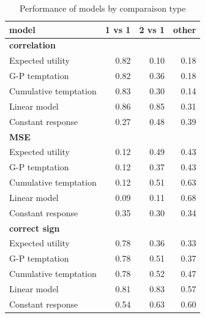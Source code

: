 \documentclass[
]{book}
\begin{document}
\begin{table}

\caption{\label{tab:comp-models-table3}Performance of models by comparaison type}
\centering
\begin{tabular}[t]{l|r|r|r}
\hline
model & 1 vs 1 & 2 vs 1 & other\\
\hline
\multicolumn{4}{l}{\textbf{correlation}}\\
\hline
\hspace{1em}Expected utility & 0.82 & 0.10 & 0.18\\
\hline
\hspace{1em}G-P temptation & 0.82 & 0.36 & 0.18\\
\hline
\hspace{1em}Cumulative temptation & 0.83 & 0.30 & 0.14\\
\hline
\hspace{1em}Linear model & 0.86 & 0.85 & 0.31\\
\hline
\hspace{1em}Constant response & 0.27 & 0.48 & 0.39\\
\hline
\multicolumn{4}{l}{\textbf{MSE}}\\
\hline
\hspace{1em}Expected utility & 0.12 & 0.49 & 0.43\\
\hline
\hspace{1em}G-P temptation & 0.12 & 0.37 & 0.43\\
\hline
\hspace{1em}Cumulative temptation & 0.12 & 0.51 & 0.63\\
\hline
\hspace{1em}Linear model & 0.09 & 0.11 & 0.68\\
\hline
\hspace{1em}Constant response & 0.35 & 0.30 & 0.34\\
\hline
\multicolumn{4}{l}{\textbf{correct sign}}\\
\hline
\hspace{1em}Expected utility & 0.78 & 0.36 & 0.33\\
\hline
\hspace{1em}G-P temptation & 0.78 & 0.51 & 0.37\\
\hline
\hspace{1em}Cumulative temptation & 0.78 & 0.52 & 0.47\\
\hline
\hspace{1em}Linear model & 0.81 & 0.83 & 0.57\\
\hline
\hspace{1em}Constant response & 0.54 & 0.63 & 0.60\\
\hline
\end{tabular}
\end{table}
\end{document}
